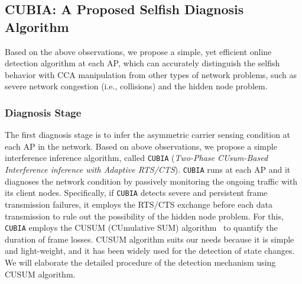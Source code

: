 \subsection{CUBIA: A Proposed Selfish Diagnosis Algorithm}

Based on the above observations, we propose a simple, yet efficient
online detection algorithm at each AP, which can accurately distinguish
the selfish behavior with CCA manipulation from other types of network
problems, such as severe network congestion (i.e., collisions) and
the hidden node problem.

\subsubsection{Diagnosis Stage}
%
The first diagnosis stage is to infer the asymmetric carrier sensing
condition at each AP in the network. Based on above observations,
we propose a simple interference inference algorithm, called {\tt CUBIA}
({\em Two-Phase CUsum-Based Interference inference with Adaptive RTS/CTS}).
%
%
{\tt CUBIA} runs at each AP and it diagnoses the network condition by passively
monitoring the ongoing traffic with its client nodes.
%
Specifically, if {\tt CUBIA} detects severe and persistent frame transmission
failures, it employs the RTS/CTS exchange before each data transmission
to rule out the possibility of the hidden node problem.
%
%
For this, {\tt CUBIA} employs the CUSUM (CUmulative SUM) algorithm~\cite{Gustafsson:2000}
to quantify the duration of frame losses. CUSUM algorithm suits our needs
because it is simple and light-weight, and it has been widely used for the
detection of state changes. We will elaborate the detailed procedure of
the detection mechanism using CUSUM algorithm.

